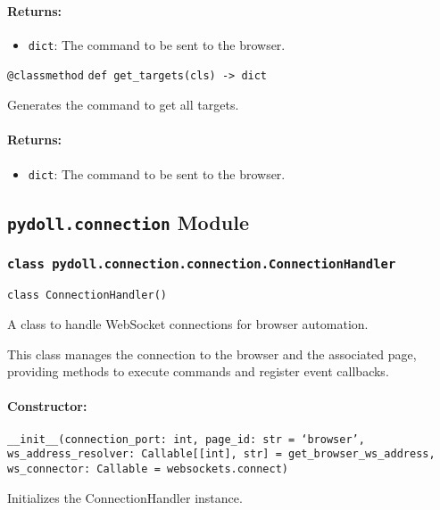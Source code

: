 \documentclass{article}
\begin{document}
\paragraph{Returns:}
\begin{itemize}
    \item \texttt{dict}: The command to be sent to the browser.
\end{itemize}

\noindent\texttt{@classmethod}
\noindent\texttt{def get\_targets(cls) -> dict}

\noindent Generates the command to get all targets.

\paragraph{Returns:}
\begin{itemize}
    \item \texttt{dict}: The command to be sent to the browser.
\end{itemize}

\hrulefill

\subsection*{\texttt{pydoll.connection} Module}

\subsubsection*{\texttt{class pydoll.connection.connection.ConnectionHandler}}
\noindent\texttt{class ConnectionHandler()}

\noindent A class to handle WebSocket connections for browser automation.

\noindent This class manages the connection to the browser and the associated page, providing methods to execute commands and register event callbacks.

\paragraph{Constructor:}
\noindent\texttt{\_\_init\_\_(connection\_port: int, page\_id: str = `browser', ws\_address\_resolver: Callable[[int], str] = get\_browser\_ws\_address, ws\_connector: Callable = websockets.connect)}

\noindent Initializes the ConnectionHandler instance.
\end{document}
